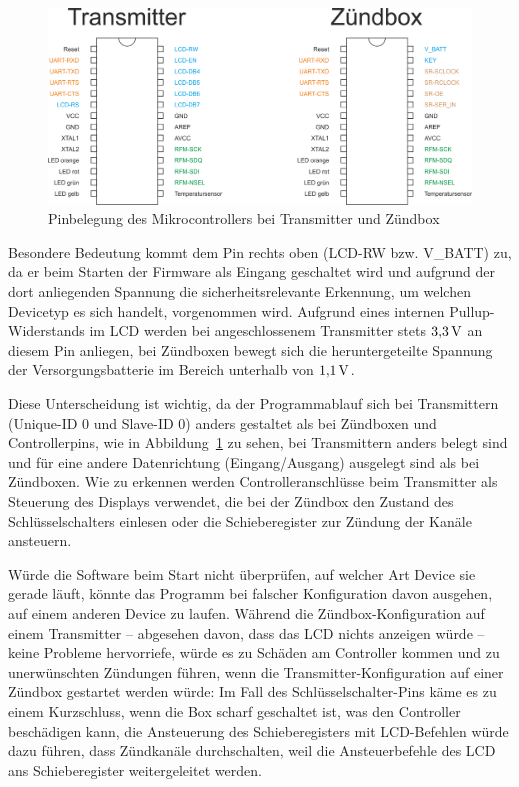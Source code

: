 \documentclass[pdftex, parskip, numbers=noenddot, toc=listof]{scrbook}
\begin{document}
	\begin{figure}
		\centering
		\includegraphics[width=.7\textwidth]{Bilder/pinout}
		\caption{Pinbelegung des Mikrocontrollers bei Transmitter und Zündbox}
		\label{fig:pinout}
	\end{figure}

	Besondere Bedeutung kommt dem Pin rechts oben (LCD-RW bzw. V\_BATT) zu, da er beim Starten der Firmware als Eingang geschaltet wird und aufgrund der dort anliegenden Spannung die sicherheitsrelevante Erkennung, um welchen Devicetyp es sich handelt, vorgenommen wird. Aufgrund eines internen Pullup-Widerstands im LCD werden bei angeschlossenem Transmitter stets $\unit[3{,}3]{V}$ an diesem Pin anliegen, bei Zündboxen bewegt sich die heruntergeteilte Spannung der Versorgungsbatterie im Bereich unterhalb von $\unit[1{,}1]{V}$.

	Diese Unterscheidung ist wichtig, da der Programmablauf sich bei Transmittern (Unique-ID 0 und Slave-ID 0) anders gestaltet als bei Zündboxen und Controllerpins, wie in Abbildung~\ref{fig:pinout} zu sehen, bei Transmittern anders belegt sind und für eine andere Datenrichtung (Eingang/Ausgang) ausgelegt sind als bei Zündboxen.  Wie zu erkennen werden Controlleranschlüsse beim Transmitter als Steuerung des Displays verwendet, die bei der Zündbox den Zustand des Schlüsselschalters einlesen oder die Schieberegister zur Zündung der Kanäle ansteuern.

	Würde die Software beim Start nicht überprüfen, auf welcher Art Device sie gerade läuft, könnte das Programm bei falscher Konfiguration davon ausgehen, auf einem anderen Device zu laufen. Während die Zündbox-Konfiguration auf einem Transmitter -- abgesehen davon, dass das LCD nichts anzeigen würde -- keine Probleme hervorriefe, würde es zu Schäden am Controller kommen und zu unerwünschten Zündungen führen, wenn die Transmitter-Konfiguration auf einer Zündbox gestartet werden würde: Im Fall des Schlüsselschalter-Pins käme es  zu einem Kurzschluss, wenn die Box scharf geschaltet ist, was den Controller beschädigen kann, die Ansteuerung des Schieberegisters mit LCD-Befehlen würde dazu führen, dass Zündkanäle durchschalten, weil die Ansteuerbefehle des LCD ans Schieberegister weitergeleitet werden.
\end{document}

